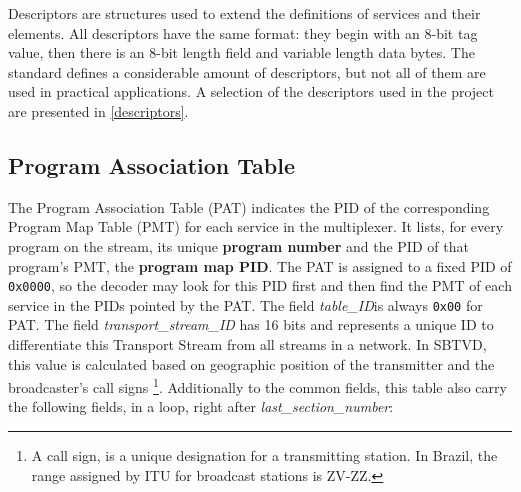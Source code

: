 \documentclass[
	12pt,				%
	openright,			%
	twoside,			%
	a4paper,			%
	brazil,
	french,				%
	english
	]{abntex2}
\begin{document}

Descriptors are structures used to extend the definitions of services and their elements. All descriptors have the same format: they begin with an 8-bit tag value, then there is an 8-bit length field and variable length data bytes. The standard defines a considerable amount of descriptors, but not all of them are used in practical applications. A selection of the descriptors used in the project are presented in \autoref{descriptors}.


\subsection{Program Association Table}

The Program Association Table (PAT) indicates the PID of the corresponding Program Map Table (PMT) for each service in the multiplexer. It lists, for every program on the stream, its unique \textbf{program number} and the PID of that program's PMT, the \textbf{program map PID}. The PAT is assigned to a fixed PID of \texttt{0x0000}, so the decoder may look for this PID first and then find the PMT of each service in the PIDs pointed by the PAT. The field \textit{table\_ID}is always \texttt{0x00} for PAT. The field \textit{transport\_stream\_ID} has 16 bits and represents a unique ID to differentiate this Transport Stream from all streams in a network. In SBTVD, this value is calculated based on geographic position of the transmitter and the broadcaster's call signs \footnote{A call sign, is a unique designation for a transmitting station. In Brazil, the range assigned by ITU for broadcast stations is ZV-ZZ\cite{anatel}.}. Additionally to the common fields, this table also carry the following fields, in a loop, right after \textit{last\_section\_number}:
\end{document}
